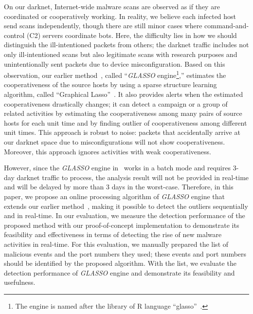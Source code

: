 \documentclass[conference]{IEEEtran}
\begin{document}
On our darknet, Internet-wide malware scans are observed as if they are coordinated or cooperatively working.
In reality, we believe each infected host send scans independently, though there are still minor cases where command-and-control (C2) servers coordinate bots.
Here, the difficulty lies in how we should distinguish the ill-intentioned packets from others; the darknet traffic includes not only ill-intentioned scans but also legitimate scans with research purposes and unintentionally sent packets due to device misconfiguration.
Based on this observation, our earlier method~\cite{Han}, called ``{\it GLASSO} engine\footnote{The engine is named after the library of R language ``glasso''~\cite{Friedman_glasso}.},'' estimates the cooperativeness of the source hosts by using a sparse structure learning algorithm, called ``Graphical Lasso''~\cite{Friedman}.
It also provides alerts when the estimated cooperativeness drastically changes; it can detect a campaign or a group of related activities by estimating the cooperativeness among many pairs of source hosts for each unit time and by finding outlier of cooperativeness among different unit times.
This approach is robust to noise:  packets that accidentally arrive at our darknet space due to misconfigurations will not show cooperativeness.
Moreover, this approach ignores activities with weak cooperativeness.

However, since the {\it GLASSO} engine in~\cite{Han} works in a batch mode and requires 3-day darknet traffic to process, the analysis result will not be provided in real-time and will be delayed by more than 3 days in the worst-case.
Therefore, in this paper, we propose an online processing algorithm of {\it GLASSO} engine that extends our earlier method~\cite{Han}, making it possible to detect the outliers sequentially and in real-time.
In our evaluation, we measure the detection performance of the proposed method with our proof-of-concept implementation to demonstrate its feasibility and effectiveness in terms of detecting the rise of new malware activities in real-time.
For this evaluation, we manually prepared the list of malicious events and the port numbers they used; these events and port numbers should be identified by the proposed algorithm.
With the list, we evaluate the detection performance of {\it GLASSO} engine and demonstrate its feasibility and usefulness.
\end{document}
